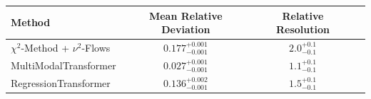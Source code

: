     \begin{tabular}{lccc}
        \toprule
        Method & Mean Relative Deviation & Relative Resolution \\
        \midrule
        $\chi^2$-Method + $\nu^2$-Flows & $0.177_{-0.001}^{+0.001}$ & $2.0_{-0.1}^{+0.1}$ \\
        MultiModalTransformer & $0.027_{-0.001}^{+0.001}$ & $1.1_{-0.1}^{+0.1}$ \\
        RegressionTransformer & $0.136_{-0.001}^{+0.002}$ & $1.5_{-0.1}^{+0.1}$ \\
        \bottomrule
    \end{tabular}